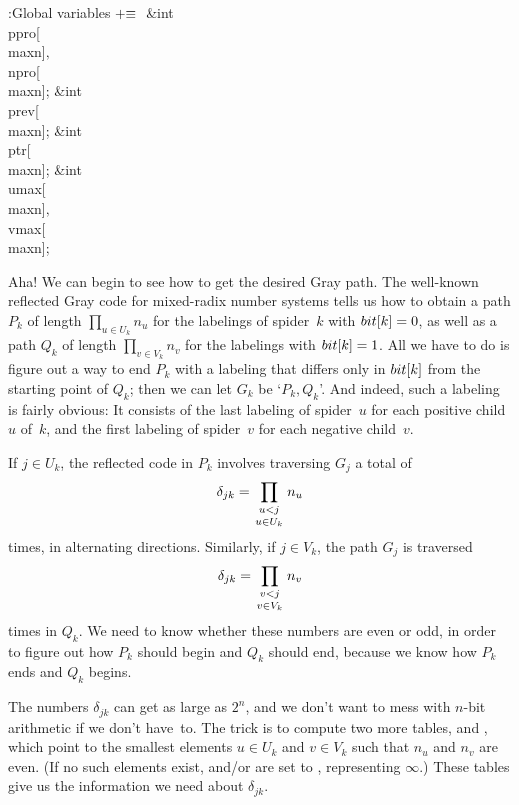 \Y\B\4:Global variables\X${}\mathrel+\equiv{}$\6
\&{int} \\{ppro}[\\{maxn}]${},{}$ \\{npro}[\\{maxn}];\6
\&{int} \\{prev}[\\{maxn}];\6
\&{int} \\{ptr}[\\{maxn}];\6
\&{int} \\{umax}[\\{maxn}]${},{}$ \\{vmax}[\\{maxn}];\par
\fi

Aha! We can begin to see how to get the desired Gray path. The well-known
reflected Gray code for mixed-radix number systems tells us how to obtain a
path $P_k$ of length $\prod_{u\in U_k}n_u$ for the labelings of
spider~$k$ with $\\{bit}[k]=0$, as
well as a path $Q_k$ of length $\prod_{v\in V_k}n_v$ for the labelings with
$\\{bit}[k]=1$. All we have to do is figure out a way to end $P_k$ with
a labeling that differs only in $\\{bit}[k]$ from the starting point of $Q_k$;
then we can let $G_k$ be `$P_k, Q_k$'. And indeed, such a labeling
is fairly obvious: It consists of the last labeling of spider~$u$ for
each positive child $u$ of~$k$, and the first labeling of spider~$v$ for
each negative child~$v$.

If $j\in U_k$, the reflected code in $P_k$ involves traversing $G_j$
a total of
$$\delta_{jk}=
\prod_{\scriptstyle u<j_{\mathstrut}\atop\scriptstyle u\in U_k}n_u$$
times, in alternating directions. Similarly, if $j\in V_k$, the path $G_j$
is traversed
$$\delta_{jk}=
\prod_{\scriptstyle v<j_{\mathstrut}\atop\scriptstyle v\in V_k}n_v$$
times in $Q_k$. We need to know whether these numbers are even or odd,
in order to figure out how $P_k$ should begin and $Q_k$ should end,
because we know how $P_k$ ends and $Q_k$ begins.

The numbers $\delta_{jk}$ can get as large as $2^n$, and we don't want to
mess with $n$-bit arithmetic if we don't have~to.
The trick is to compute two more tables,  and ,
which point to the smallest elements $u\in U_k$ and $v\in V_k$ such that
$n_u$ and $n_v$ are even. (If no such elements exist,
 and/or  are set to ,
representing $\infty$.)
These tables give us the information we need about $\delta_{jk}$.

